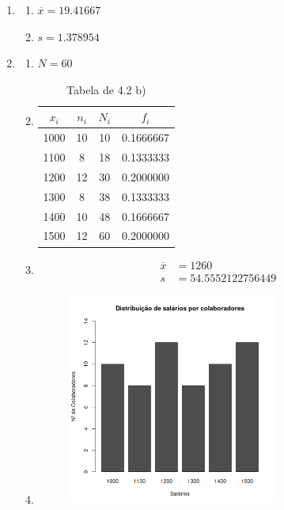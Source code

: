 \documentclass[11pt,a4paper]{article}
\begin{document}
\begin{enumerate}[label=\arabic{section}.\arabic*]
	\item {}
		\begin{enumerate}[label=\alph*)]
		\item $\overline{x} = 19.41667$\hfill
			
		\item $s = 1.378954$\hfill
			
		\end{enumerate}
	\item {}\hfill
		\begin{enumerate}[label=\alph*)]
		\item $N = 60$\hfill
			
		\item \hfill
			\begin{table}[h!]
				\centering
				\begin{tabular}{|c|c|c|c|}
					\hline
					$x_i$&$n_i$&$N_i$&$f_i$ \\
					\hline
					1000&10&10&0.1666667\\
					\hline
					1100& 8&18&0.1333333\\
					\hline
					1200&12&30&0.2000000\\
					\hline
					1300& 8&38&0.1333333\\
					\hline
					1400&10&48&0.1666667\\
					\hline
					1500&12&60&0.2000000\\
					\hline
				\end{tabular}
				\caption{Tabela de 4.2 b)}
			\end{table}
			
		\item \hfill
			\begin{align*}
				\overline{x} &= 1260 \\
				s &= 54.5552122756449
			\end{align*}
			
		\clearpage
		\item \hfill
			\begin{figure}[h!]
				\centering
				\includegraphics[width=0.7\textwidth]{./recursos/ex4_2d.png}

\end{figure}
\end{enumerate}
\end{enumerate}
\end{document}

